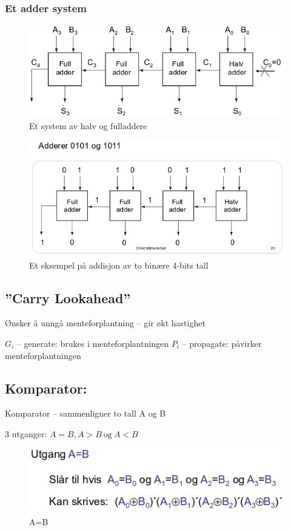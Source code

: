 \documentclass{article}
\begin{document}
	\subsubsection{Et adder system}
	\begin{figure}[H]
		\includegraphics[scale = 0.6]{adderment.jpg}
		\caption{Et system av halv og fulladdere}
	\end{figure}
	
	\begin{figure}[H]
		\includegraphics[scale = 0.6]{addeks.jpg}
		\caption{Et eksempel på addisjon av to binære 4-bits tall}
	\end{figure}
	
	\subsection{”Carry Lookahead”}
	 Ønsker å unngå menteforplantning – gir økt hastighet
	 
	 $G_i$ – generate: brukes i menteforplantningen
	 $P_i$ – propagate: påvirker menteforplantningen
	
	\subsection{Komparator:}
	Komparator – sammenligner to tall A og B 
	
	3 utganger: $A=B, A>B\ \text{og} \ A<B$
	
	\begin{figure}[H]
		\includegraphics[scale = 0.6]{komp1.jpg}
		\caption{A=B}
	\end{figure}
	
\end{document}
